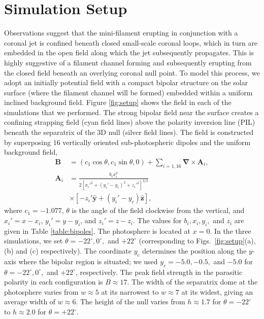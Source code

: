 \documentclass[twocolumn]{aastex6}
\begin{document}
\section{Simulation Setup}
\label{sec:setup}
Observations suggest that the mini-filament erupting in conjunction with a coronal jet is confined beneath closed small-scale coronal loops, which in turn are embedded in the open field along which the jet subsequently propagates. This is highly suggestive of a filament channel forming and subsequently erupting from the closed field beneath an overlying coronal null point. To model this process, we adopt an initially potential field with a compact bipolar structure on the solar surface (where the filament channel will be formed) embedded within a uniform inclined background field. Figure \ref{fig:setup} shows the field in each of the simulations that we performed. The strong bipolar field near the surface creates a confining strapping field (cyan field lines) above the polarity inversion line (PIL) beneath the separatrix of the 3D null (silver field lines). The field is constructed by superposing $16$ vertically oriented sub-photospheric dipoles and the uniform background field,
\begin{align}
\mathbf{B} &= \left(c_{1}\cos\theta,c_{1}\sin\theta,0\right) + \sum_{i=1,16} \boldsymbol{\nabla} \times \mathbf{A}_{i},\\
\mathbf{A}_{i} &= \frac{b_{i}x_{i}^{3}}{2\left[ x_{i}'^{2} + (y_{i}'-y_{c})^{2} + z_{i}'^{2} \right]^{3/2}}\nonumber\\
               &\times \left[ -z_{i}' \hat{\mathbf{y}} + (y_{i}'-y_{c}) \hat{\mathbf{z}} \right],
\end{align}
where $c_{1} = -1.077$, $\theta$ is the angle of the field clockwise from the vertical, and $x_{i}' = x-x_{i}$, $y_{i}' = y-y_{i}$, and $z_{i}' = z-z_{i}$. The values for $b_{i}, x_{i}, y_{i},$ and $z_{i}$ are given in Table \ref{table:bipoles}. The photosphere is located at $x=0$. In the three simulations, we set $\theta = -22^\circ, 0^\circ,$ and $+22^\circ$ (corresponding to Figs.\ \ref{fig:setup}(a), (b) and (c) respectively). The coordinate $y_{c}$ determines the position along the $y$-axis where the bipolar region is situated; we used $y_{c} = -5.0, -0.5,$ and $-5.0$ for $\theta = -22^\circ, 0^\circ,$ and $+22^\circ$, respectively. The peak field strength in the parasitic polarity in each configuration is $B \approx 17$. The width of the separatrix dome at the photosphere varies from $w \approx 5$ at its narrowest to $w \approx 7$ at its widest, giving an average width of $w \approx 6$. The height of the null varies from $h \approx 1.7$ for $\theta = -22^\circ$ to $ h\approx 2.0$ for $\theta = +22^\circ$. 
\end{document}
